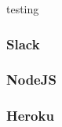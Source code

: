 testing

\subsubsection{Slack}
\label{sec:slack}


\subsubsection{NodeJS}
\label{sec:nodejs}


\subsubsection{Heroku}
\label{sec:heroku}

